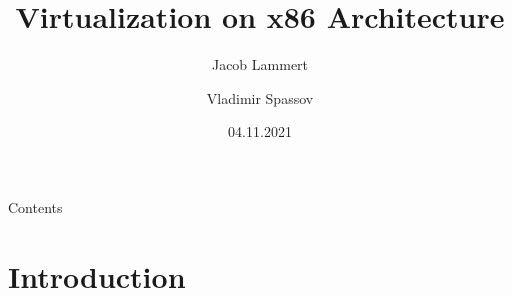 \documentclass[11pt, aspectratio=169, modernfonts]{beamer}
\title{Virtualization on x86 Architecture}
\author{Jacob Lammert\and Vladimir Spassov}
\date{04.11.2021}
\institute{Bauhaus-Universität Weimar}
\theoremstyle{definition}
\theoremstyle{remark}
\begin{document}
\lstset{language=C}
\maketitle

\nocite{*}



\begin{frame}{Contents}
    \tableofcontents
\end{frame}

\section{Introduction}
\end{document}
